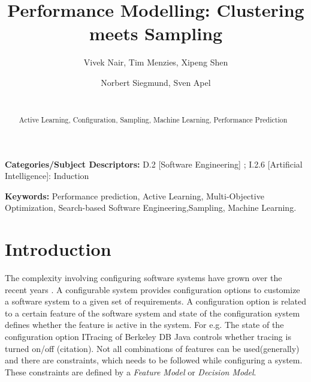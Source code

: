 \documentclass{sig-alternative}
\begin{document}
\title{ Performance Modelling: Clustering meets Sampling}
\author{
        \alignauthor Vivek Nair, Tim Menzies, Xipeng Shen 
    \and  
        \alignauthor Norbert Siegmund, Sven Apel \\
        \\
       }

\maketitle 
\thispagestyle{plain}
\pagestyle{plain}
\begin{abstract}
Active Learning, Configuration, Sampling, Machine Learning, Performance Prediction


\end{abstract}

\vspace{1mm}
\noindent
{\bf Categories/Subject Descriptors:} 
D.2 [Software Engineering] ;
I.2.6 [Artificial Intelligence]: Induction

 
\vspace{1mm}
\noindent

{\bf Keywords:} Performance prediction, Active Learning, 
Multi-Objective Optimization,
Search-based Software Engineering,Sampling, Machine Learning.

 
 
\section{Introduction}
 The complexity involving configuring software systems have grown over the recent years \cite{berger2013study}. A configurable system provides configuration options to customize a software system to a given set of requirements. 
 A configuration option is related to a certain feature of the software system and state of the configuration system defines whether the feature is  active in the system.
 For e.g. The state of the configuration option ITracing of  Berkeley DB Java controls whether tracing is turned on/off (citation). Not all combinations of features can be used(generally) and there are constraints, which needs to be followed while configuring a system. These constraints are defined by a \textit{Feature Model}\cite{kang1990feature} or \textit{Decision Model}\cite{schmid2011comparison}. 
 
\end{document}
